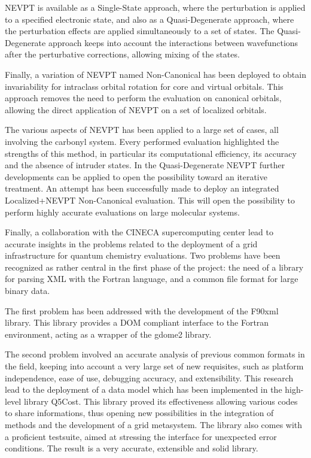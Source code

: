 NEVPT is available as a Single-State approach, where the perturbation is
applied to a specified electronic state, and also as a Quasi-Degenerate
approach, where the perturbation effects are applied simultaneously to a set
of states. The Quasi-Degenerate approach keeps into account the
interactions between wavefunctions after the perturbative corrections,
allowing mixing of the states.

Finally, a variation of NEVPT named Non-Canonical has been deployed to
obtain invariability for intraclass orbital rotation for core and virtual
orbitals. This approach removes the need to perform the evaluation on
canonical orbitals, allowing the direct application of NEVPT on a set of
localized orbitals.

The various aspects of NEVPT has been applied to a large set of cases, all
involving the carbonyl system. Every performed evaluation highlighted the
strengths of this method, in particular its computational efficiency, its
accuracy and the absence of intruder states.  In the Quasi-Degenerate NEVPT
further developments can be applied to open the possibility toward an
iterative treatment. An attempt has been successfully made to deploy an
integrated Localized+NEVPT Non-Canonical evaluation. This will open the
possibility to perform highly accurate evaluations on large molecular
systems.

Finally, a collaboration with the CINECA supercomputing center lead to
accurate insights in the problems related to the deployment of a grid
infrastructure for quantum chemistry evaluations. Two problems have been
recognized as rather central in the first phase of the project: the need of
a library for parsing XML with the Fortran language, and a common file
format for large binary data.

The first problem has been addressed with the development of the F90xml library.
This library provides a DOM compliant interface to the Fortran environment,
acting as a wrapper of the gdome2 library.

The second problem involved an accurate analysis of previous common formats
in the field, keeping into account a very large set of new requisites, such
as platform independence, ease of use, debugging accuracy, and
extensibility.  This research lead to the deployment of a data model which
has been implemented in the high-level library Q5Cost. This library proved
its effectiveness allowing various codes to share informations, thus opening
new possibilities in the integration of methods and the development of a
grid metasystem. The library also comes with a proficient testsuite, aimed
at stressing the interface for unexpected error conditions. The result is a
very accurate, extensible and solid library. 

